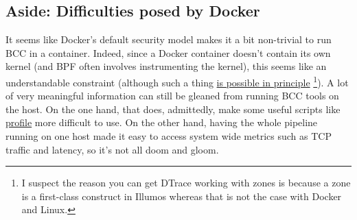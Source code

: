 \documentclass[11pt]{article}
\begin{document}
\subsection*{Aside: Difficulties posed by Docker}
\label{sec:org593925c}
It seems like Docker's default security model makes it a bit non-trivial to run BCC in a container. Indeed, since a Docker container doesn't contain its own
kernel (and BPF often involves instrumenting the kernel), this seems like an understandable constraint (although such a thing \href{http://dtrace.org/blogs/bmc/2012/06/07/dtrace-in-the-zone/}{is possible in principle} \footnote{I suspect the reason you can get DTrace working with zones is because a zone is a first-class construct in Illumos whereas that is not the case with Docker and Linux.}). A lot
of very meaningful information can still be gleaned from running BCC tools on the host. On the one hand, that does, admittedly, make some useful scripts like \href{https://github.com/iovisor/bcc/blob/master/tools/profile.py}{profile} more difficult to use.
On the other hand, having the whole pipeline running on one host made it easy to access system wide metrics such as TCP traffic and latency, so it's not all doom and gloom.
\end{document}
